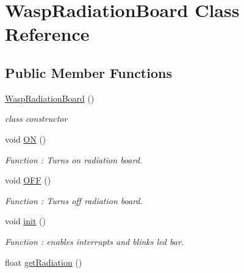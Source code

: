 \hypertarget{class_wasp_radiation_board}{}\section{Wasp\+Radiation\+Board Class Reference}
\label{class_wasp_radiation_board}
\subsection*{Public Member Functions}
\begin{DoxyCompactItemize}
\item 
\hyperlink{class_wasp_radiation_board_afda1ff55d83b655c2c8f78b6ade93fe2}{Wasp\+Radiation\+Board} ()
\begin{DoxyCompactList}\small\item\em class constructor \end{DoxyCompactList}\item 
void \hyperlink{class_wasp_radiation_board_a7bf3a2d3d6e249caae59c56c88d71ec9}{ON} ()\hypertarget{class_wasp_radiation_board_a7bf3a2d3d6e249caae59c56c88d71ec9}{}\label{class_wasp_radiation_board_a7bf3a2d3d6e249caae59c56c88d71ec9}

\begin{DoxyCompactList}\small\item\em Function \+: Turns on radiation board. \end{DoxyCompactList}\item 
void \hyperlink{class_wasp_radiation_board_a992b76be02839dc9be863905681f99e5}{O\+FF} ()\hypertarget{class_wasp_radiation_board_a992b76be02839dc9be863905681f99e5}{}\label{class_wasp_radiation_board_a992b76be02839dc9be863905681f99e5}

\begin{DoxyCompactList}\small\item\em Function \+: Turns off radiation board. \end{DoxyCompactList}\item 
void \hyperlink{class_wasp_radiation_board_a8fddaa9a0e74ea3fa1cffd6f71bae5c5}{init} ()\hypertarget{class_wasp_radiation_board_a8fddaa9a0e74ea3fa1cffd6f71bae5c5}{}\label{class_wasp_radiation_board_a8fddaa9a0e74ea3fa1cffd6f71bae5c5}

\begin{DoxyCompactList}\small\item\em Function \+: enables interrupts and blinks led bar. \end{DoxyCompactList}\item 
float \hyperlink{class_wasp_radiation_board_ac482073a37e62507559def645220a9ae}{get\+Radiation} ()\hypertarget{class_wasp_radiation_board_ac482073a37e62507559def645220a9ae}{}\label{class_wasp_radiation_board_ac482073a37e62507559def645220a9ae}


\end{DoxyCompactItemize}
